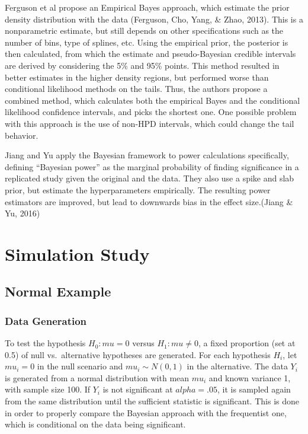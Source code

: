 \documentclass[12pt,twoside]{dukestatscithesis}
\theoremstyle{definition}
\theoremstyle{definition}
\theoremstyle{definition}
\theoremstyle{remark}
\begin{document}
Ferguson et al propose an Empirical Bayes approach, which estimate the
prior density distribution with the data (Ferguson, Cho, Yang, \& Zhao,
2013). This is a nonparametric estimate, but still depends on other
specifications such as the number of bins, type of splines, etc. Using
the empirical prior, the posterior is then calculated, from which the
estimate and pseudo-Bayesian credible intervals are derived by
considering the 5\% and 95\% points. This method resulted in better
estimates in the higher density regions, but performed worse than
conditional likelihood methods on the tails. Thus, the authors propose a
combined method, which calculates both the empirical Bayes and the
conditional likelihood confidence intervals, and picks the shortest one.
One possible problem with this approach is the use of non-HPD intervals,
which could change the tail behavior.

Jiang and Yu apply the Bayesian framework to power calculations
specifically, defining ``Bayesian power'' as the marginal probability of
finding significance in a replicated study given the original and the
data. They also use a spike and slab prior, but estimate the
hyperparameters empirically. The resulting power estimators are
improved, but lead to downwards bias in the effect size.(Jiang \& Yu,
2016)

\chapter{Simulation Study}\label{simulation-study}

\section{Normal Example}\label{normal-example}

\subsection{Data Generation}\label{data-generation}

To test the hypothesis \(H_0: mu = 0\) versus \(H_1: mu \neq 0\), a
fixed proportion (set at 0.5) of null vs.~alternative hypotheses are
generated. For each hypothesis \(H_i\), let \(mu_i = 0\) in the null
scenario and \(mu_i \sim N(0,1)\) in the alternative. The data \(Y_i\)
is generated from a normal distribution with mean \(mu_i\) and known
variance 1, with sample size 100. If \(Y_i\) is not significant at
\(alpha = .05\), it is sampled again from the same distribution until
the sufficient statistic is significant. This is done in order to
properly compare the Bayesian approach with the frequentist one, which
is conditional on the data being significant.
\end{document}
